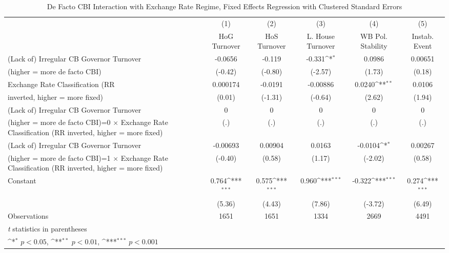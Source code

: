 \begin{table}[htbp]\centering
\def\sym#1{\ifmmode^{#1}\else\(^{#1}\)\fi}
\caption{De Facto CBI Interaction with Exchange Rate Regime, Fixed Effects Regression with Clustered Standard Errors \label{imultIndFEDF}}
\begin{tabular}{l*{5}{c}}
\toprule
                                        &\multicolumn{1}{c}{(1)}&\multicolumn{1}{c}{(2)}&\multicolumn{1}{c}{(3)}&\multicolumn{1}{c}{(4)}&\multicolumn{1}{c}{(5)}\\
                                        &\multicolumn{1}{c}{HoG Turnover}&\multicolumn{1}{c}{HoS Turnover}&\multicolumn{1}{c}{L. House Turnover}&\multicolumn{1}{c}{WB Pol. Stability}&\multicolumn{1}{c}{Instab. Event}\\
\midrule
(Lack of) Irregular CB Governor Turnover&  -0.0656         &   -0.119         &   -0.331\sym{*}  &   0.0986         &  0.00651         \\
(higher = more de facto CBI)            &  (-0.42)         &  (-0.80)         &  (-2.57)         &   (1.73)         &   (0.18)         \\
\addlinespace
Exchange Rate Classification (RR        & 0.000174         &  -0.0191         & -0.00886         &   0.0240\sym{**} &   0.0106         \\
inverted, higher = more fixed)          &   (0.01)         &  (-1.31)         &  (-0.64)         &   (2.62)         &   (1.94)         \\
\addlinespace
(Lack of) Irregular CB Governor Turnover&        0         &        0         &        0         &        0         &        0         \\
(higher = more de facto CBI)=0 $\times$ Exchange Rate Classification (RR inverted, higher = more fixed)&      (.)         &      (.)         &      (.)         &      (.)         &      (.)         \\
\addlinespace
(Lack of) Irregular CB Governor Turnover& -0.00693         &  0.00904         &   0.0163         &  -0.0104\sym{*}  &  0.00267         \\
(higher = more de facto CBI)=1 $\times$ Exchange Rate Classification (RR inverted, higher = more fixed)&  (-0.40)         &   (0.58)         &   (1.17)         &  (-2.02)         &   (0.58)         \\
\addlinespace
Constant                                &    0.764\sym{***}&    0.575\sym{***}&    0.960\sym{***}&   -0.322\sym{***}&    0.274\sym{***}\\
                                        &   (5.36)         &   (4.43)         &   (7.86)         &  (-3.72)         &   (6.49)         \\
\midrule
Observations                            &     1651         &     1651         &     1334         &     2669         &     4491         \\
\bottomrule
\multicolumn{6}{l}{\footnotesize \textit{t} statistics in parentheses}\\
\multicolumn{6}{l}{\footnotesize \sym{*} \(p<0.05\), \sym{**} \(p<0.01\), \sym{***} \(p<0.001\)}\\
\end{tabular}
\end{table}
